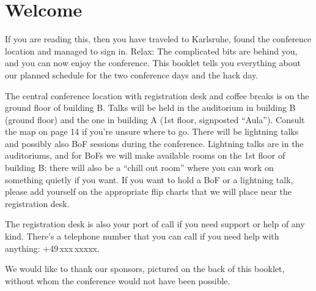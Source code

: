 \newpage
\section*{Welcome} \label{welcome}
\vspace{-0.4em}
If you are reading this, then you have traveled to
Karls\-ruhe, found the conference location and managed to
sign in. Relax: The complicated bits are behind you, and
you can now enjoy the conference.
This booklet tells you everything about our planned
schedule for the two conference days and the hack day.

The central conference location with registration desk and
coffee breaks is on the ground floor of building B. Talks will
be held in the auditorium in building B (ground floor) and
the one in building A (1st floor, signposted ``Aula'').
Consult the map on page 14 if you're unsure where to go.
There will be lightning talks and possibly also BoF sessions
during the conference. Lightning talks are in the
auditoriums, and for BoFs we will make available rooms on
the 1st floor of building B; there will also be a ``chill out
room'' where you can work on something quietly if you
want. If you want to hold a BoF or a lightning talk, please
add yourself on the appropriate flip charts that we will
place near the registration desk.

The registration desk is also your port of call if you need
support or help of any kind. There's a telephone number
that you can call if you need help with anything: 
+49\,xxx\,xxxxx.

We would like to thank our sponsors, pictured on the back
of this booklet, without whom the conference would not
have been possible.

